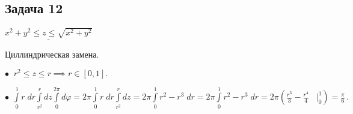 \documentclass[a4paper, fleqn]{article}
\begin{document}
    \subsection*{Задача 12}

    $\underline{x^2 + y^2 \leq z \leq \sqrt{x^2 + y^2}}$

    Циллиндрическая замена.

    $\bullet \; \; r^2 \leq z \leq r \implies r \in [0, 1].$

    $\bullet \; \, \int\limits_{0}^{1} r \; dr \int\limits_{r^2}^{r} dz \int\limits_{0}^{2 \pi} d \varphi =  2 \pi  \int\limits_{0}^{1} r \; dr \int\limits_{r^2}^{r} dz  =
      2 \pi  \int\limits_{0}^{1} r^2 - r^3 \; dr = 2 \pi  \int\limits_{0}^{1} r^2 - r^3 \; dr = 2 \pi \left( \frac{r^3}{3} - \frac{r^4}{4} \; \; \;
      \Bigg|_{0}^{1} \right) = \boxed{\frac{\pi}{6}} \, .$


\end{document}
